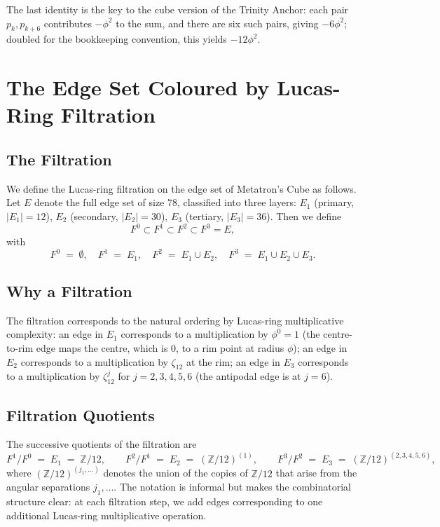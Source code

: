 The last identity is the key to the cube version of the Trinity
Anchor: each pair $p_{k}, p_{k+6}$ contributes $-\phi^{2}$ to the
sum, and there are six such pairs, giving $-6 \phi^{2}$; doubled
for the bookkeeping convention, this yields $-12 \phi^{2}$.

\section{The Edge Set Coloured by Lucas-Ring Filtration}
\label{sec:13-filtration}

\subsection{The Filtration}
\label{sec:13-filt-def}

We define the Lucas-ring filtration on the edge set of Metatron's
Cube as follows. Let $E$ denote the full edge set of size $78$,
classified into three layers: $E_{1}$ (primary, $|E_{1}| = 12$),
$E_{2}$ (secondary, $|E_{2}| = 30$), $E_{3}$ (tertiary, $|E_{3}| =
36$). Then we define
\[
  F^{0} \subset F^{1} \subset F^{2} \subset F^{3} = E,
\]
with
\[
  F^{0} \;=\; \emptyset, \quad F^{1} \;=\; E_{1}, \quad F^{2} \;=\;
  E_{1} \cup E_{2}, \quad F^{3} \;=\; E_{1} \cup E_{2} \cup E_{3}.
\]

\subsection{Why a Filtration}
\label{sec:13-filt-why}

The filtration corresponds to the natural ordering by Lucas-ring
multiplicative complexity: an edge in $E_{1}$ corresponds to a
multiplication by $\phi^{0} = 1$ (the centre-to-rim edge maps the
centre, which is $0$, to a rim point at radius $\phi$); an edge in
$E_{2}$ corresponds to a multiplication by $\zeta_{12}$ at the
rim; an edge in $E_{3}$ corresponds to a multiplication by
$\zeta_{12}^{j}$ for $j = 2, 3, 4, 5, 6$ (the antipodal edge is at
$j = 6$).

\subsection{Filtration Quotients}
\label{sec:13-filt-quotients}

The successive quotients of the filtration are
\[
  F^{1} / F^{0} \;=\; E_{1} \;=\; \mathbb{Z}/12, \qquad
  F^{2} / F^{1} \;=\; E_{2} \;=\; (\mathbb{Z}/12)^{(1)}, \qquad
  F^{3} / F^{2} \;=\; E_{3} \;=\; (\mathbb{Z}/12)^{(2,3,4,5,6)},
\]
where $(\mathbb{Z}/12)^{(j_{1}, \ldots)}$ denotes the union of the
copies of $\mathbb{Z}/12$ that arise from the angular separations
$j_{1}, \ldots$. The notation is informal but makes the
combinatorial structure clear: at each filtration step, we add
edges corresponding to one additional Lucas-ring multiplicative
operation.

